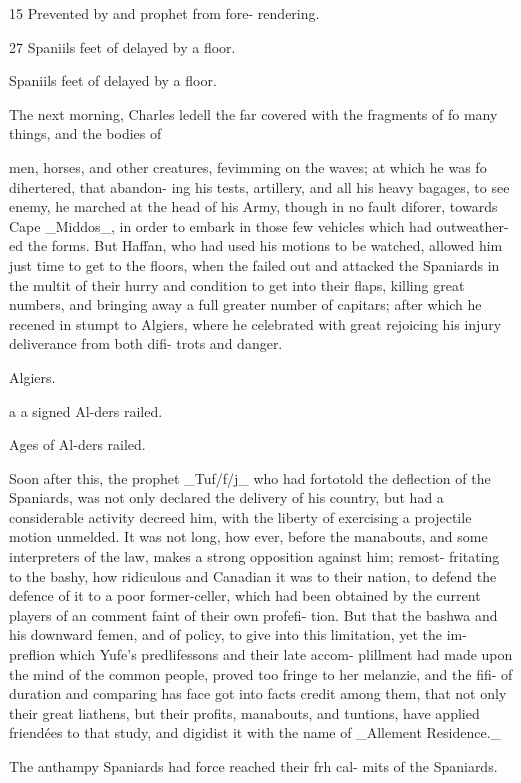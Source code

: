 \documentclass{article}
\begin{document}
15 Prevented by and prophet from fore- rendering.

27 Spaniils feet of delayed by a floor.

Spaniils feet of delayed by a floor.

The next morning, Charles ledell the far covered with the fragments of fo many things, and the bodies of

men, horses, and other creatures, fevimming on the waves; at which he was fo dihertered, that abandon- ing his tests, artillery, and all his heavy bagages, to see enemy, he marched at the head of his Army, though in no fault diforer, towards Cape \_Middos\_, in order to embark in those few vehicles which had outweather- ed the forms. But Haffan, who had used his motions to be watched, allowed him just time to get to the floors, when the failed out and attacked the Spaniards in the multit of their hurry and condition to get into their flaps, killing great numbers, and bringing away a full greater number of capitars; after which he recened in stumpt to Algiers, where he celebrated with great rejoicing his injury deliverance from both difi- trots and danger.

Algiers.

a a signed Al-ders railed.

Ages of Al-ders railed.

Soon after this, the prophet \_Tuf/f/j\_ who had fortotold the deflection of the Spaniards, was not only declared the delivery of his country, but had a considerable activity decreed him, with the liberty of exercising a projectile motion unmelded. It was not long, how ever, before the manabouts, and some interpreters of the law, makes a strong opposition against him; remost- fritating to the bashy, how ridiculous and Canadian it was to their nation, to defend the defence of it to a poor former-celler, which had been obtained by the current players of an comment faint of their own profefi- tion. But that the bashwa and his downward femen, and of policy, to give into this limitation, yet the im- preflion which Yufe’s predlifessons and their late accom- plillment had made upon the mind of the common people, proved too fringe to her melanzie, and the fifi- of duration and comparing has face got into facts credit among them, that not only their great liathens, but their profits, manabouts, and tuntions, have applied friendées to that study, and digidist it with the name of \_Allement Residence.\_

The anthampy Spaniards had force reached their frh cal- mits of the Spaniards.
\end{document}
